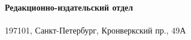 \thispagestyle{empty}
\addtocounter{page}{-1} %

\vspace*{\fill}

\noindent
\textbf{Редакционно-издательский отдел} \\
\textbf{\docUniveristy} \\
197101, Санкт-Петербург, Кронверкский пр., 49А
